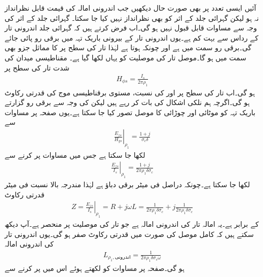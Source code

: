 آئیں ایسی تعدد پر بھی صورت حال دیکھیں جب اندرونی امالہ کی قیمت قابل نظرانداز نہ ہو لیکن گہرائی جلد کے اثر کو بھی نظرانداز نہیں کیا جا سکتا۔ گہرائی جلد کے اثر کی وجہ سے مساوات  قابل قبول نہیں ہو گی۔اب فرض کرتے ہیں کہ گہرائی جلد  اندرونی تار کے رداس  سے بہت کم ہے۔یوں اندرونی تار کے بیرونی باریک تہہ میں برقی رو پائی جائے گی۔برقی رو  سمت میں ہے اور چونکہ  ہوتا ہے لہٰذا تار کی سطح پر  کا مماثل جزو بھی  سمت میں ہو گا۔موصل تار کی موصلیت کو یہاں  لکھا گیا ہے۔ مقناطیسی میدان کی شدت تار کی سطح پر 
\begin{align}\label{مساوات_ترسیلی_ہم_محوری_تار_اندرونی_تار_مقناطیسی_میدان}
H_{\phi s}=\frac{I_s}{2\pi \rho_1}
\end{align}
ہو گی۔اب تار کی سطح پر  اور  کی نسبت، مستوی برقناطیسی موج کی  قدرتی رکاوٹ ہو گی۔اگرچہ ہم نلکی اشکال کی بات کر رہے ہیں لیکن  کی وجہ سے برقی رو گزارتے باریک تہہ کو  موٹائی اور  چوڑائی کا موصل تصور کیا جا سکتا ہے۔یوں صفحہ  پر مساوات  سے
\begin{align*}
\left. \frac{E_{zs}}{H_{ys}}\right|_{\rho_1}=\frac{1+j}{\sigma_c \delta}
\end{align*}
لکھا جا سکتا ہے جس میں مساوات  پر کرنے سے
\begin{align*}
\left. \frac{E_{zs}}{I_s} \right|_{\rho_1} =\frac{1+j}{2\pi \rho_1 \delta \sigma_c }
\end{align*}
لکھا جا سکتا ہے۔چونکہ  دراصل فی میٹر برقی دباؤ ہے لہٰذا مندرجہ بالا نسبت  فی میٹر قدرتی رکاوٹ
\begin{align}\label{مساوات_ترسیلی_رکاوٹ_بلند_تعدد_ہم_محوری}
Z=\left. \frac{E_{zs}}{I_s} \right|_{\rho_1}=R+j \omega L=\frac{1}{2\pi \rho_1 \delta \sigma_c }+j \frac{1}{2\pi \rho_1 \delta \sigma_c }
\end{align}
 کے برابر ہے۔یہ امالہ تار کی اندرونی امالہ ہے جو تار کی موصلیت  پر منحصر ہے۔آپ دیکھ سکتے ہیں کہ کامل موصل کی صورت میں قدرتی رکاوٹ صفر ہو گی۔یوں اندرونی تار کی اندرونی امالہ
\begin{align*}
L_{\rho_1,\text{اندرونی}}=\frac{1}{2\pi \rho_1 \delta \sigma_c \omega}
\end{align*}
ہو گی۔صفحہ  پر مساوات  کو  لکھتے ہوئے اس میں پر کرنے سے
